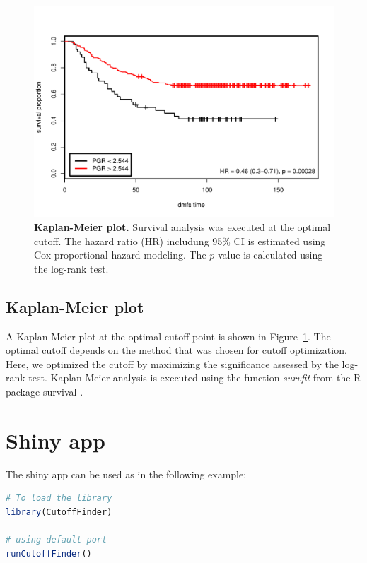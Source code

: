 \documentclass[12pt, a4paper]{article}
\begin{document}
\begin{figure}[t]
\centering
\includegraphics{Cutoff_Finder_manual-008}
\caption{\textbf{Kaplan-Meier plot.}
Survival analysis was executed at the optimal cutoff.
The hazard ratio (HR) includung 95\% CI is estimated using Cox proportional hazard modeling. The $p$-value is calculated using the log-rank test.}
\label{fig:km}
\end{figure}

\subsection{Kaplan-Meier plot}
A Kaplan-Meier plot at the optimal cutoff point is shown in Figure~\ref{fig:km}.
The optimal cutoff depends on the method that was chosen for cutoff optimization.
Here, we optimized the cutoff by maximizing the significance assessed by the log-rank test.
Kaplan-Meier analysis is executed using the function \emph{survfit} from the R package survival \cite{survival}.

\section{Shiny app}
The shiny app can be used as in the following example:

\begin{lstlisting}[language=R]
# To load the library
library(CutoffFinder)

# using default port
runCutoffFinder()
\end{lstlisting}

\newpage



\end{document}
